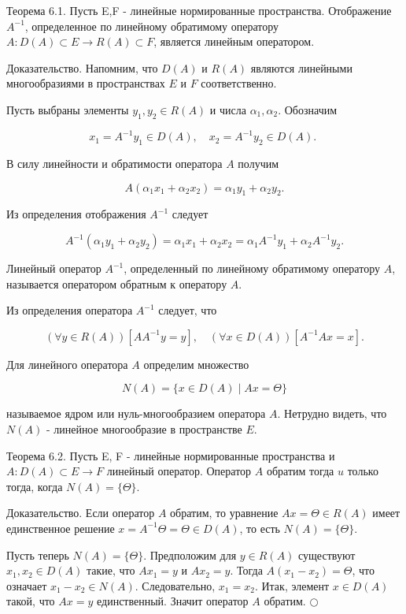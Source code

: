 Теорема 6.1. Пусть E,F - линейные нормированные пространства. Отображение $A^{-1}$, определенное по линейному обратимому оператору $A: D(A) \subset E \rightarrow R(A) \subset F$, является линейным оператором.

Доказательство. Напомним, что $D(A)$ и $R(A)$ являются линейными многообразиями в пространствах $E$ и $F$ соответственно.

Пусть выбраны элементы $y_{1}, y_{2} \in R(A)$ и числа $\alpha_{1}, \alpha_{2}$. Обозначим

$$
x_{1}=A^{-1} y_{1} \in D(A), \quad x_{2}=A^{-1} y_{2} \in D(A) \text {. }
$$

В силу линейности и обратимости оператора $A$ получим

$$
A\left(\alpha_{1} x_{1}+\alpha_{2} x_{2}\right)=\alpha_{1} y_{1}+\alpha_{2} y_{2} .
$$

Из определения отображения $A^{-1}$ следует

$$
A^{-1}\left(\alpha_{1} y_{1}+\alpha_{2} y_{2}\right)=\alpha_{1} x_{1}+\alpha_{2} x_{2}=\alpha_{1} A^{-1} y_{1}+\alpha_{2} A^{-1} y_{2} .
$$

Линейный оператор $A^{-1}$, определенный по линейному обратимому оператору $A$, называется оператором обратным к оператору $A$.

Из определения оператора $A^{-1}$ следует, что

$$
(\forall y \in R(A))\left[A A^{-1} y=y\right], \quad(\forall x \in D(A))\left[A^{-1} A x=x\right] .
$$

Для линейного оператора $A$ определим множество

$$
N(A)=\{x \in D(A) \mid A x=\Theta\}
$$

называемое ядром или нуль-многообразием оператора $A$. Нетрудно видеть, что $N(A)$ - линейное многообразие в пространстве $E$.

Теорема 6.2. Пусть E, F - линейные нормированные пространства и $A: D(A) \subset E \rightarrow F$ линейный оператор. Оператор $A$ обратим тогда $u$ только тогда, когда $N(A)=\{\Theta\}$.

Доказательство. Если оператор $A$ обратим, то уравнение $A x=\Theta \in R(A)$ имеет единственное решение $x=A^{-1} \Theta=\Theta \in D(A)$, то есть $N(A)=\{\Theta\}$.

Пусть теперь $N(A)=\{\Theta\}$. Предположим для $y \in R(A)$ существуют $x_{1}, x_{2} \in D(A)$ такие, что $A x_{1}=y$ и $A x_{2}=y$. Тогда $A\left(x_{1}-x_{2}\right)=\Theta$, что означает $x_{1}-x_{2} \in N(A)$. Следовательно, $x_{1}=x_{2}$. Итак, элемент $x \in D(A)$ такой, что $A x=y$ единственный. Значит оператор $A$ обратим. $\bigcirc$

